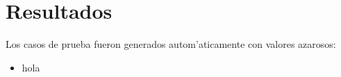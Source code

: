 \section{Resultados}
Los casos de prueba fueron generados autom'aticamente con valores azarosos:
\begin{itemize}
\item hola
\end{itemize}

